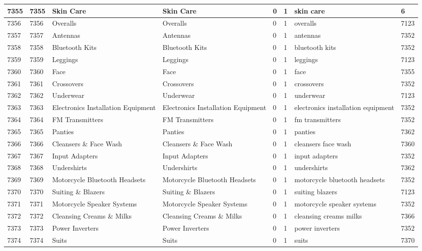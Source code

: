 \begin{longtable}{|l|l|l|l|l|l|l|l|}
7355 & 7355 & Skin Care & Skin Care & 0 & 1 & skin care & 6 \\ \hline 
7356 & 7356 & Overalls & Overalls & 0 & 1 & overalls & 7123 \\ \hline 
7357 & 7357 & Antennas & Antennas & 0 & 1 & antennas & 7352 \\ \hline 
7358 & 7358 & Bluetooth Kits & Bluetooth Kits & 0 & 1 & bluetooth kits & 7352 \\ \hline 
7359 & 7359 & Leggings & Leggings & 0 & 1 & leggings & 7123 \\ \hline 
7360 & 7360 & Face & Face & 0 & 1 & face & 7355 \\ \hline 
7361 & 7361 & Crossovers & Crossovers & 0 & 1 & crossovers & 7352 \\ \hline 
7362 & 7362 & Underwear & Underwear & 0 & 1 & underwear & 7123 \\ \hline 
7363 & 7363 & Electronics Installation Equipment & Electronics Installation Equipment & 0 & 1 & electronics installation equipment & 7352 \\ \hline 
7364 & 7364 & FM Transmitters & FM Transmitters & 0 & 1 & fm transmitters & 7352 \\ \hline 
7365 & 7365 & Panties & Panties & 0 & 1 & panties & 7362 \\ \hline 
7366 & 7366 & Cleansers \& Face Wash & Cleansers \& Face Wash & 0 & 1 & cleansers face wash & 7360 \\ \hline 
7367 & 7367 & Input Adapters & Input Adapters & 0 & 1 & input adapters & 7352 \\ \hline 
7368 & 7368 & Undershirts & Undershirts & 0 & 1 & undershirts & 7362 \\ \hline 
7369 & 7369 & Motorcycle Bluetooth Headsets & Motorcycle Bluetooth Headsets & 0 & 1 & motorcycle bluetooth headsets & 7352 \\ \hline 
7370 & 7370 & Suiting \& Blazers & Suiting \& Blazers & 0 & 1 & suiting blazers & 7123 \\ \hline 
7371 & 7371 & Motorcycle Speaker Systems & Motorcycle Speaker Systems & 0 & 1 & motorcycle speaker systems & 7352 \\ \hline 
7372 & 7372 & Cleansing Creams \& Milks & Cleansing Creams \& Milks & 0 & 1 & cleansing creams milks & 7366 \\ \hline 
7373 & 7373 & Power Inverters & Power Inverters & 0 & 1 & power inverters & 7352 \\ \hline 
7374 & 7374 & Suits & Suits & 0 & 1 & suits & 7370 \\ \hline 

\end{longtable}
